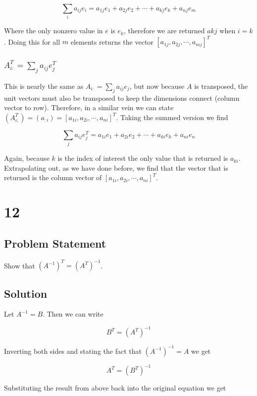 \documentclass[11pt,a4paper,final]{article}
\begin{document}
\begin{equation*}
\sum_i a_{ij}e_i = a_{1j}e_1 + a_{2j}e_2 + \cdots + a_{kj}e_{k} + a_{nj}e_m
\end{equation*}

Where the only nonzero value in \(e\) is \(e_k\), therefore we are returned \(a{kj}\) when \(i=k\). Doing this for all \(m\)
elements returns the vector \([a_{1j},a_{2j},\cdots,a_{mj}]^T\)

\subsubsection{\(A_{i:}^T = \sum_j a_{ij}e_{j}^T\)}
\label{sec:org8f23db5}
This is nearly the same as \(A_{i:} = \sum_j a_{ij}e_{j}\), but now because \(A\) is transposed, the unit vectors must also be
transposed to keep the dimensions connect (column vector to row). Therefore, in a similar vein we can state \((A_{i:}^T)
= (a_{:i}) = [a_{1i},a_{2i},\cdots,a_{ni}]^T\). Taking the summed version we find

\begin{equation*}
\sum_j a_{ij}e_j^T = a_{1i}e_1 + a_{2i}e_2 + \cdots + a_{ki}e_{k} + a_{ni}e_n
\end{equation*}

Again, because \(k\) is the index of interest the only value that is returned is \(a_{ki}\). Extrapolating out, as we have
done before, we find that the vector that is returned is the column vector of \([a_{1i},a_{2i},\cdots,a_{ni}]^T\).

\section{12}
\label{sec:org7ff5da4}
\subsection{Problem Statement}
\label{sec:orgd9d6eb0}
Show that \((A^{-1})^T = (A^T)^{-1}\).

\subsection{Solution}
\label{sec:orgd923e82}
Let \(A^{-1} = B\). Then we can write

$$
B^T = (A^T)^{-1}
$$

Inverting both sides and stating the fact that \((A^{-1})^{-1} = A\) we get

$$
A^T = (B^T)^{-1}
$$

Substituting the result from above back into the original equation we get
\end{document}
